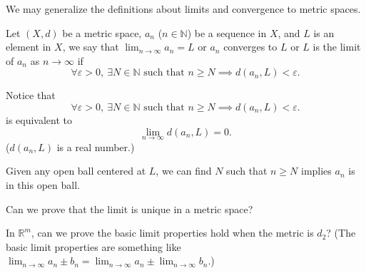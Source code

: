 We may generalize the definitions about limits and convergence to metric spaces. 

\begin{definition}
    Let \((X,d)\) be a metric space, \(a_n\) (\(n \in \mathbb{N} \)) be a sequence in \(X\), and \(L\) is an element in \(X\), we say that \(\lim_{n \to \infty} a_n = L \) or \(a_n\) converges to \(L\) or \(L\) is the limit of \(a_n\) as \(n \to \infty \) if 
    \[
        \forall \varepsilon > 0, \ \exists N \in \mathbb{N}  \text{ such that } n \ge N \implies d(a_n, L) < \varepsilon .
    \]          
\end{definition}
\begin{note}
    Notice that 
    \[
        \forall \varepsilon > 0, \ \exists N \in \mathbb{N}  \text{ such that } n \ge N \implies d(a_n, L) < \varepsilon . 
    \]
    is equivalent to 
    \[
        \lim_{n \to \infty} d(a_n, L) = 0. 
    \]
    (\(d(a_n,L)\) is a real number.)
\end{note}
\begin{intuition}
    Given any open ball centered at \(L\), we can find \(N\) such that \(n \ge N\) implies \(a_n\) is in this open ball.   
\end{intuition}
\begin{exercise}
    Can we prove that the limit is unique in a metric space?
\end{exercise}
\begin{exercise}
    In \(\mathbb{R} ^m\), can we prove the basic limit properties hold when the metric is \(d_2\)? (The basic limit properties are something like \(\lim_{n \to \infty} a_n \pm b_n = \lim_{n \to \infty}  a_n \pm \lim_{n \to \infty} b_n \).)  
\end{exercise}

